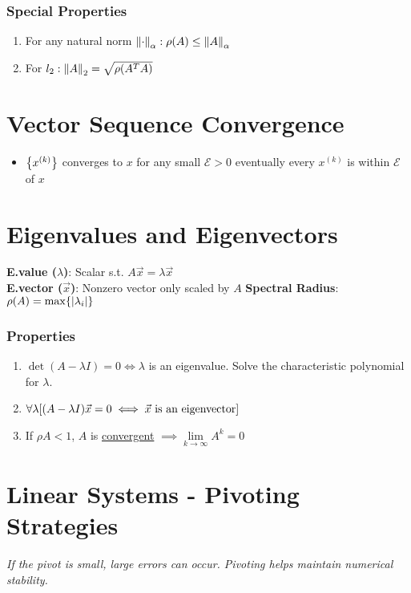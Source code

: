 \documentclass[9pt, letterpaper]{extarticle}
\newcommand{\bigEps}{\mathcal{E}}
\begin{document}
\begin{multicols*}{3}
  \subsubsection{Special Properties}
  \begin{enumerate}
    \item For any natural norm $\norm{\cdot}_\alpha:\rho(A) \leq \norm{A}_\alpha$
    \item For $l_2:\norm{A}_2 = \sqrt{\rho(A^TA)}$
  \end{enumerate}

  \section{Vector Sequence Convergence}
  \begin{itemize}
    \item $\Bqty{x^{(k)}}$ converges to $x$ for any small $\bigEps > 0$
      eventually every $x^{(k)}$ is within $\bigEps$ of $x$
  \end{itemize}

  \section{Eigenvalues and Eigenvectors}
  \textbf{E.value ($\lambda$)}: Scalar s.t. $A\vec{x} = \lambda \vec{x}$ \\
  \textbf{E.vector ($\vec{x}$)}: Nonzero vector only scaled by $A$
  \textbf{Spectral Radius}: $\rho(A) = \max \{\abs{\lambda_i}\}$
  \subsubsection{Properties}
  \begin{enumerate}
    \item $\det(A-\lambda I) = 0 \iff \lambda$ is an eigenvalue. Solve the
      characteristic polynomial for $\lambda$.
    \item $\forall \lambda \bqty{(A-\lambda I)\vec{x} = 0 \iff \vec x \text{ is an
      eigenvector}}$
    \item If $\rho A < 1$, $A$ is \uline{convergent} $\implies 
      \underset{k\to\infty}{\lim} A^k = 0$
  \end{enumerate}

  \section{Linear Systems - Pivoting Strategies}
  \textit{If the pivot is small, large errors can occur. Pivoting helps maintain numerical stability.}


\end{multicols*}
\end{document}

